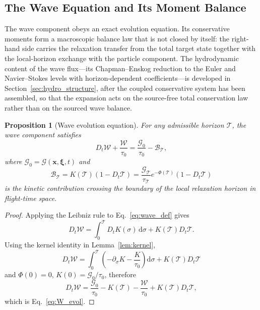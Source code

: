 \documentclass[preprint,12pt]{elsarticle}
\newtheorem{proposition}{Proposition}
\begin{document}
\subsection{The Wave Equation and Its Moment Balance}\label{sec:wave}

The wave component obeys an exact evolution equation. Its conservative moments form a macroscopic balance law that is not closed by itself: the right-hand side carries the relaxation transfer from the total target state together with the local-horizon exchange with the particle component. The hydrodynamic content of the wave flux---its Chapman--Enskog reduction to the Euler and Navier--Stokes levels with horizon-dependent coefficients---is developed in Section~\ref{sec:hydro_structure}, after the coupled conservative system has been assembled, so that the expansion acts on the source-free total conservation law rather than on the sourced wave balance.

\begin{proposition}[Wave evolution equation]\label{prop:wave_evol}
For any admissible horizon $\mathcal{T}$, the wave component satisfies
\begin{equation}\label{eq:W_evol}
    D_t\mathcal{W}+\frac{\mathcal{W}}{\tau_0}
    =
    \frac{\mathcal{G}_0}{\tau_0}-\mathcal B_\mathcal{T} ,
\end{equation}
where $\mathcal{G}_0=\mathcal{G}(\boldsymbol{x},\boldsymbol{\xi},t)$ and
\begin{equation}\label{eq:BL_def}
    \mathcal B_\mathcal{T}=K(\mathcal{T})\left(1-D_t \mathcal{T}\right)
    =
    \frac{\mathcal{G}_\mathcal{T}}{\tau_\mathcal{T}}e^{-\Phi(\mathcal{T})}\left(1-D_t \mathcal{T}\right)
\end{equation}
is the kinetic contribution crossing the boundary of the local relaxation horizon in flight-time space.
\end{proposition}

\begin{proof}
Applying the Leibniz rule to Eq.~\eqref{eq:wave_def} gives
\begin{equation}
    D_t\mathcal{W}
    =
    \int_0^\mathcal{T} D_t K(\sigma)\,\mathrm{d}\sigma
    +K(\mathcal{T})D_t \mathcal{T} .
\end{equation}
Using the kernel identity in Lemma~\ref{lem:kernel},
\begin{equation}
    D_t\mathcal{W}
    =
    \int_0^\mathcal{T} \left(-\partial_\sigma K-\frac{K}{\tau_0}\right)\mathrm{d}\sigma
    +K(\mathcal{T})D_t \mathcal{T}
\end{equation}
and $\Phi(0)=0$, $K(0)=\mathcal{G}_0/\tau_0$, therefore
\begin{equation}
    D_t\mathcal{W}
    =
    \frac{\mathcal{G}_0}{\tau_0}
    -K(\mathcal{T})
    -\frac{\mathcal{W}}{\tau_0}
    +K(\mathcal{T})D_t \mathcal{T} ,
\end{equation}
which is Eq.~\eqref{eq:W_evol}.
\end{proof}
\end{document}
